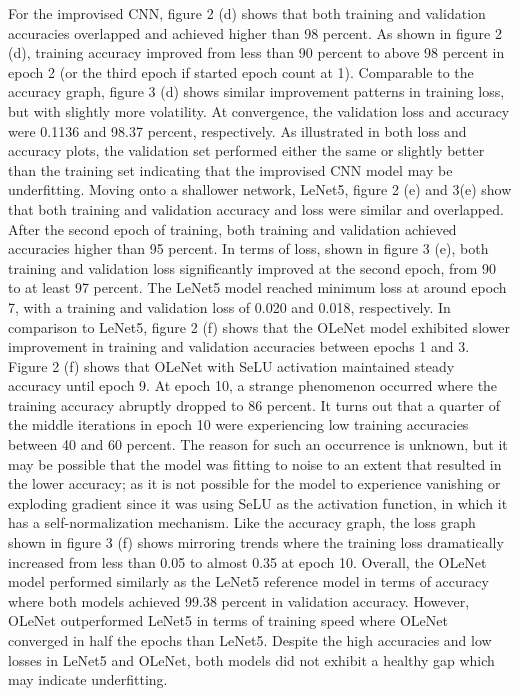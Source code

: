 \documentclass[conference]{IEEEtran}
\begin{document}
For the improvised CNN, figure 2 (d) shows that both training and validation accuracies overlapped and achieved higher than 98 percent. As shown in figure 2 (d), training accuracy improved from less than 90 percent to above 98 percent in epoch 2 (or the third epoch if started epoch count at 1). Comparable to the accuracy graph, figure 3 (d) shows similar improvement patterns in training loss, but with slightly more volatility. At convergence, the validation loss and accuracy were 0.1136 and 98.37 percent, respectively. As illustrated in both loss and accuracy plots, the validation set performed either the same or slightly better than the training set indicating that the improvised CNN model may be underfitting.
Moving onto a shallower network, LeNet5, figure 2 (e) and 3(e) show that both training and validation accuracy and loss were similar and overlapped. After the second epoch of training, both training and validation achieved accuracies higher than 95 percent. In terms of loss, shown in figure 3 (e), both training and validation loss significantly improved at the second epoch, from 90 to at least 97 percent. The LeNet5 model reached minimum loss at around epoch 7, with a training and validation loss of 0.020 and 0.018, respectively. 
In comparison to LeNet5, figure 2 (f) shows that the OLeNet model exhibited slower improvement in training and validation accuracies between epochs 1 and 3. Figure 2 (f) shows that OLeNet with SeLU activation maintained steady accuracy until epoch 9. At epoch 10, a strange phenomenon occurred where the training accuracy abruptly dropped to 86 percent. It turns out that a quarter of the middle iterations in epoch 10 were experiencing low training accuracies between 40 and 60 percent. The reason for such an occurrence is unknown, but it may be possible that the model was fitting to noise to an extent that resulted in the lower accuracy; as it is not possible for the model to experience vanishing or exploding gradient since it was using SeLU as the activation function, in which it has a self-normalization mechanism. Like the accuracy graph, the loss graph shown in figure 3 (f) shows mirroring trends where the training loss dramatically increased from less than 0.05 to almost 0.35 at epoch 10. Overall, the OLeNet model performed similarly as the LeNet5 reference model in terms of accuracy where both models achieved 99.38 percent in validation accuracy. However, OLeNet outperformed LeNet5 in terms of training speed where OLeNet converged in half the epochs than LeNet5. Despite the high accuracies and low losses in LeNet5 and OLeNet, both models did not exhibit a healthy gap which may indicate underfitting.
\end{document}

